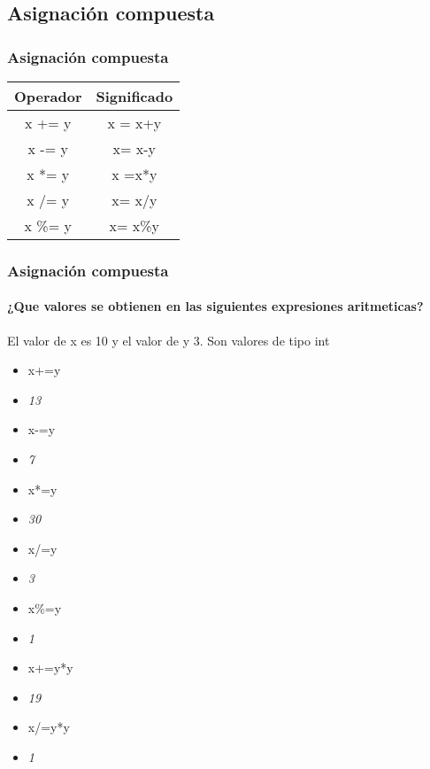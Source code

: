 \documentclass{beamer}
\begin{document}
\subsection{Asignación compuesta}
\begin{frame}
\frametitle{Asignación compuesta}
\begin{center}
\begin{large}
\begin{tabular}{|c|c|}
\hline
Operador&Significado\\
\hline
x += y&x = x+y\\
\hline
x -= y&x= x-y\\
\hline
x *= y&x =x*y\\
\hline
x /= y&x= x/y\\
\hline
x \%= y&x= x\%y\\
\hline
\end{tabular}
\end{large}
\end{center}
\end{frame}


\begin{frame}
\frametitle{Asignación compuesta}
\framesubtitle{¿Que valores se obtienen en las siguientes expresiones aritmeticas?}
El valor de x es 10 y el valor de y 3. Son valores de tipo int
\begin{itemize}[<+->]
\item x+=y
\item \emph{13} 
\item x-=y
\item \emph{7}
\item x*=y
\item \emph{30}
\item x/=y
\item \emph{3}
\item x\%=y
\item \emph{1}
\item x+=y*y
\item \emph{19}
\item x/=y*y
\item \emph{1}
\end{itemize}
\end{frame}
\end{document}
